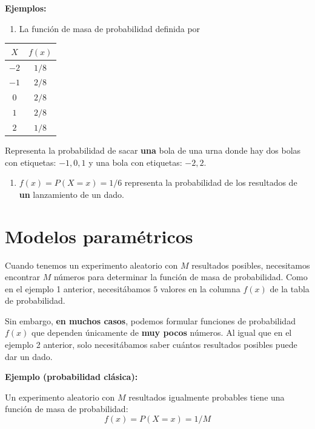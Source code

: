\documentclass[
]{book}
\providecommand{\tightlist}{%
  \setlength{\itemsep}{0pt}\setlength{\parskip}{0pt}}
\begin{document}
\textbf{Ejemplos:}

\begin{enumerate}
\def\labelenumi{\arabic{enumi})}
\tightlist
\item
  La función de masa de probabilidad definida por
\end{enumerate}

\begin{longtable}[]{@{}cc@{}}
\toprule\noalign{}
\(X\) & \(f(x)\) \\
\midrule\noalign{}
\endhead
\bottomrule\noalign{}
\endlastfoot
\(-2\) & \(1/8\) \\
\(-1\) & \(2/8\) \\
\(0\) & \(2/8\) \\
\(1\) & \(2/8\) \\
\(2\) & \(1/8\) \\
\end{longtable}

Representa la probabilidad de sacar \textbf{una} bola de una urna donde hay dos bolas con etiquetas: \(-1, 0, 1\) y una bola con etiquetas: \(-2, 2\).

\begin{enumerate}
\def\labelenumi{\arabic{enumi})}
\setcounter{enumi}{1}
\tightlist
\item
  \(f(x)=P(X=x)=1/6\) representa la probabilidad de los resultados de \textbf{un} lanzamiento de un dado.
\end{enumerate}

\hypertarget{modelos-paramuxe9tricos}{%
\section{Modelos paramétricos}\label{modelos-paramuxe9tricos}}

Cuando tenemos un experimento aleatorio con \(M\) resultados posibles, necesitamos encontrar \(M\) números para determinar la función de masa de probabilidad. Como en el ejemplo 1 anterior, necesitábamos \(5\) valores en la columna \(f(x)\) de la tabla de probabilidad.

Sin embargo, \textbf{en muchos casos}, podemos formular funciones de probabilidad \(f(x)\) que dependen únicamente de \textbf{muy pocos} números. Al igual que en el ejemplo 2 anterior, solo necesitábamos saber cuántos resultados posibles puede dar un dado.

\textbf{Ejemplo (probabilidad clásica):}

Un experimento aleatorio con \(M\) resultados igualmente probables tiene una función de masa de probabilidad:
\[f(x)=P(X=x)=1/M\]
\end{document}
